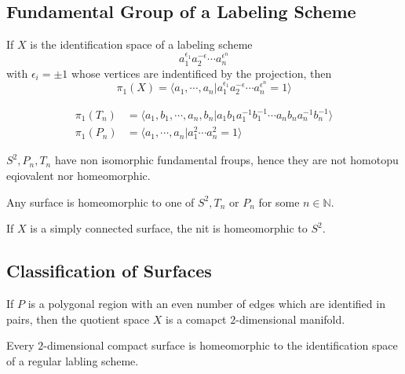 \documentclass{article}
\begin{document}
\subsection{Fundamental Group of a Labeling Scheme}

\begin{theorem}
    If $X$ is the identification space of a labeling scheme
    \[a_1^{\epsilon_1}a_2^{-\epsilon} \cdots a_n^{\epsilon^n}\]
    with $\epsilon_i = \pm 1$ whose vertices are indentificed by the projection, then
    \[\pi_1(X) = \langle a_1,\cdots,a_n|a_1^{\epsilon_1}a_2^{-\epsilon} \cdots a_n^{\epsilon^n} = 1\rangle\]
\end{theorem}

\begin{proposition}
    \[\begin{aligned}
    \pi_1(T_n) &= \langle a_1,b_1,\cdots,a_n,b_n|a_1b_1a_1^{-1}b_1^{-1}\cdots a_nb_n a_n^{-1}b_n^{-1}\rangle \\
    \pi_1(P_n) &= \langle a_1,\cdots, a_n|a_1^2\cdots a_n^2 = 1\rangle
    \end{aligned}\]
\end{proposition}


\begin{proposition}
    $S^2,P_n,T_n$ have non isomorphic fundamental froups, hence they are not homotopu eqiovalent nor homeomorphic.
\end{proposition}

\begin{theorem}
    Any surface is homeomorphic to one of $S^2, T_n$ or $P_n$ for some $n\in \mathbb{N}$.
\end{theorem}

\begin{corollary}
    If $X$ is a simply connected surface, the nit is homeomorphic to $S^2$.
\end{corollary}

\subsection{Classification of Surfaces}

\begin{proposition}
    If $P$ is a polygonal region with an even number of edges which are identified in pairs, then the quotient space $X$ is a comapct $2$-dimensional manifold.
\end{proposition}

\begin{theorem}
    Every $2$-dimensional compact surface is homeomorphic to the identification space of a regular labling scheme.
\end{theorem}
\end{document}
